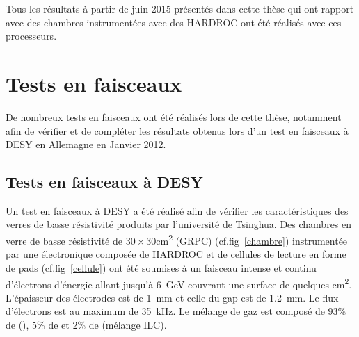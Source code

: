 \vspace*{-0.8cm}
 Tous les résultats à partir de juin 2015 présentés dans cette thèse qui ont rapport avec des chambres instrumentées avec des HARDROC ont été réalisés avec ces processeurs.
\vspace*{-0.3cm}
\section{Tests en faisceaux}
\vspace*{-0.3cm}
De nombreux tests en faisceaux ont été réalisés lors de cette thèse, notamment afin de vérifier et de compléter les résultats obtenus lors d'un test en faisceaux à DESY en Allemagne en Janvier 2012.
\vspace*{-0.25cm}
\subsection{Tests en faisceaux à DESY}
\vspace*{-0.25cm}
Un test en faisceaux à DESY \cite{Haddad:2012fx} a été réalisé afin de vérifier les caractéristiques des verres de basse résistivité produits par l'université de Tsinghua. Des chambres en verre de basse résistivité de $30\times30$\si{\square\centi\meter} (GRPC) (cf.fig~\ref{chambre}) instrumentée par une électronique composée de HARDROC et de cellules de lecture en forme de pads (cf.fig~\ref{cellule}) ont été soumises à un faisceau intense et continu d'électrons d'énergie allant jusqu'à \SI{6}{\giga\eV} couvrant une surface de quelques \si{\square\centi\meter}. L'épaisseur des électrodes est de \SI{1}{\milli\meter} et celle du gap est de \SI{1.2}{\milli\meter}. Le flux d'électrons est au maximum de \SI{35}{\kilo\hertz}. Le mélange de gaz est composé de 93\% de (), 5\% de  et 2\% de  (mélange ILC).


